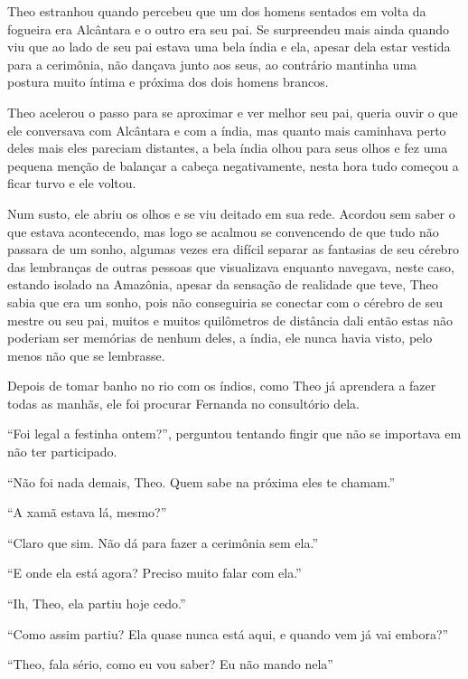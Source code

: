 Theo estranhou quando percebeu que um dos homens sentados em volta da
fogueira era Alcântara e o outro era seu pai. Se surpreendeu mais ainda
quando viu que ao lado de seu pai estava uma bela índia e ela, apesar
dela estar vestida para a cerimônia, não dançava junto aos seus, ao
contrário mantinha uma postura muito íntima e próxima dos dois homens
brancos.

Theo acelerou o passo para se aproximar e ver melhor seu pai, queria
ouvir o que ele conversava com Alcântara e com a índia, mas quanto mais
caminhava perto deles mais eles pareciam distantes, a bela índia olhou
para seus olhos e fez uma pequena menção de balançar a cabeça
negativamente, nesta hora tudo começou a ficar turvo e ele voltou.

Num susto, ele abriu os olhos e se viu
deitado em sua rede. Acordou sem saber o que estava acontecendo, mas
logo se acalmou se convencendo de que tudo não passara de um sonho,
algumas vezes era difícil separar as fantasias de seu cérebro das
lembranças de outras pessoas que visualizava enquanto navegava, neste
caso, estando isolado na Amazônia, apesar da sensação de realidade que
teve, Theo sabia que era um sonho, pois não conseguiria se conectar com
o cérebro de seu mestre ou seu pai, muitos e muitos quilômetros de
distância dali então estas não poderiam ser memórias de nenhum deles, a
índia, ele nunca havia visto, pelo menos não que se lembrasse.

\asterisc


Depois de tomar banho no rio com os índios, como Theo já aprendera a
fazer todas as manhãs, ele foi procurar Fernanda no consultório dela.

``Foi legal a festinha ontem?'', perguntou tentando fingir que não se
importava em não ter participado.

``Não foi nada demais, Theo. Quem sabe na próxima eles te chamam.''

``A xamã estava lá, mesmo?''

``Claro que sim. Não dá para fazer a cerimônia sem ela.''

``E onde ela está agora? Preciso muito falar com ela.''

``Ih, Theo, ela partiu hoje cedo.''

``Como assim partiu? Ela quase nunca está aqui, e quando vem já vai
embora?''

``Theo, fala sério, como eu vou saber? Eu não mando nela''

